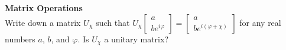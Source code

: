 \documentclass[12pt,letterpaper,boxed,cm]{hmcpset}
\begin{document}
\begin{solution}
    \vfill
\end{solution}
\newpage

\begin{problem}[4]
    \textbf{Matrix Operations}\\
    Write down a matrix $U_{\chi}$ such that $U_{\chi} \begin{bmatrix} a \\ be^{i\varphi} \end{bmatrix} = \begin{bmatrix} a \\ be^{i(\varphi+\chi)} \end{bmatrix}$ for any real numbers $a$, $b$, and $\varphi$.  Is $U_{\chi}$ a unitary matrix?
\end{problem}

\begin{solution}
    \vfill
\end{solution}

\end{document}
